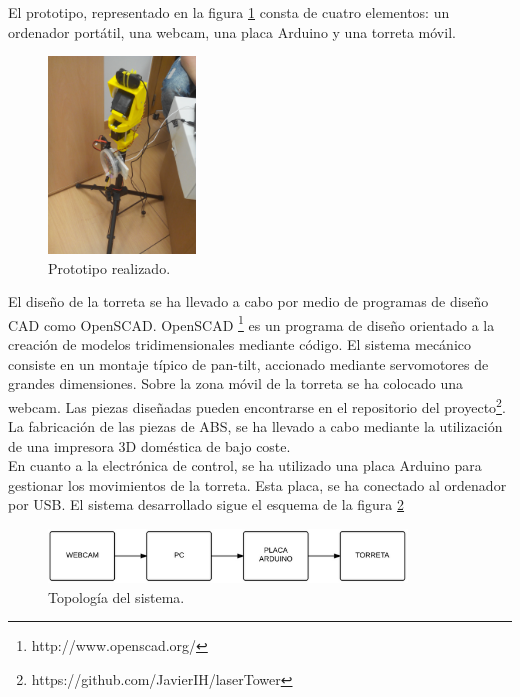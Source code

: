 El prototipo, representado en la figura \ref{prototipo} consta de cuatro elementos: un ordenador portátil, una webcam, una placa Arduino y una torreta móvil.\\

\begin{figure}[h]
\centering
\includegraphics[width=0.35\textwidth]{images/prototipo}%
\caption{Prototipo realizado.}
\label{prototipo}
\end{figure}
\FloatBarrier

El diseño de la torreta se ha llevado a cabo por medio de programas de diseño CAD como OpenSCAD. OpenSCAD 
\footnote{http://www.openscad.org/} es un programa de diseño orientado a la creación de modelos tridimensionales mediante código. El sistema mecánico consiste en un montaje típico de pan-tilt, accionado mediante servomotores de grandes dimensiones. Sobre la zona móvil de la torreta se ha colocado una webcam. Las piezas diseñadas pueden encontrarse en el repositorio del proyecto\footnote{https://github.com/JavierIH/laserTower}.\\

La fabricación de las piezas de ABS, se ha llevado a cabo mediante la utilización de una impresora 3D doméstica de bajo coste.\\

En cuanto a la electrónica de control, se ha utilizado una placa Arduino para gestionar los movimientos de la torreta. Esta placa, se ha conectado al ordenador por USB. El sistema desarrollado sigue el esquema de la figura \ref{topologia}\\

\begin{figure}[h]
\centering
\includegraphics[width=0.85\textwidth]{images/topologia}%
\caption{Topología del sistema.}
\label{topologia}
\end{figure}
\FloatBarrier

